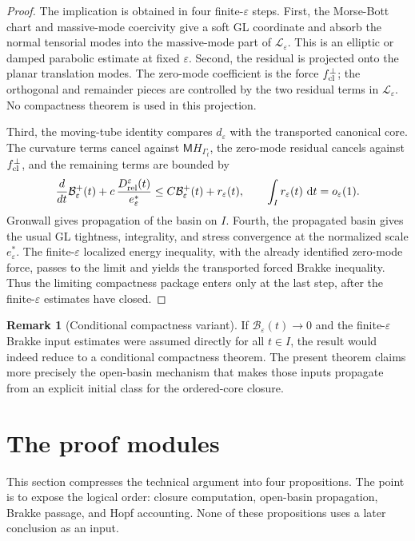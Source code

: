 \documentclass[11pt]{article}
\theoremstyle{definition}
\newtheorem{remark}[theorem]{Remark}
\newcommand{\dd}{\,\mathrm d}
\newcommand{\eps}{\varepsilon}
\newcommand{\estar}{e_\varepsilon^\ast}
\newcommand{\Basin}{\mathcal B}
\newcommand{\Ledger}{\mathcal L}
\newcommand{\Mmob}{\mathsf M}
\begin{document}
\begin{proof}
The implication is obtained in four finite-\(\eps\) steps.  First, the
Morse-Bott chart and massive-mode coercivity give a soft GL coordinate and
absorb the normal tensorial modes into the massive-mode part of
\(\Ledger_\eps\).  This is an elliptic or damped parabolic estimate at fixed
\(\eps\).  Second, the residual is projected onto the planar translation modes.
The zero-mode coefficient is the force \(f_{\rm cl}^\perp\); the orthogonal and
remainder pieces are controlled by the two residual terms in \(\Ledger_\eps\).
No compactness theorem is used in this projection.

Third, the moving-tube identity compares \(d_\eps\) with the transported
canonical core.  The curvature terms cancel against \(\Mmob H_{\Gamma_t}\), the
zero-mode residual cancels against \(f_{\rm cl}^\perp\), and the remaining
terms are bounded by
\[
        \frac{d}{dt}\Basin_\eps^+(t)
        +
        c\,\frac{D_{\rm rel}^\eps(t)}{\estar}
        \le
        C\Basin_\eps^+(t)+r_\eps(t),
        \qquad
        \int_I r_\eps(t)\,\dd t=o_\eps(1).
\]
Gronwall gives propagation of the basin on \(I\).  Fourth, the propagated basin
gives the usual GL tightness, integrality, and stress convergence at the
normalized scale \(\estar\).  The finite-\(\eps\) localized energy inequality,
with the already identified zero-mode force, passes to the limit and yields the
transported forced Brakke inequality.  Thus the limiting compactness package
enters only at the last step, after the finite-\(\eps\) estimates have closed.
\end{proof}

\begin{remark}[Conditional compactness variant]
If \(\Basin_\eps(t)\to0\) and the finite-\(\eps\) Brakke input estimates were
assumed directly for all \(t\in I\), the result would indeed reduce to a
conditional compactness theorem.  The present theorem claims more precisely the
open-basin mechanism that makes those inputs propagate from an explicit initial
class for the ordered-core closure.
\end{remark}

\section{The proof modules}
\label{sec:modules}

This section compresses the technical argument into four propositions.  The
point is to expose the logical order: closure computation, open-basin
propagation, Brakke passage, and Hopf accounting.  None of these propositions
uses a later conclusion as an input.
\end{document}
